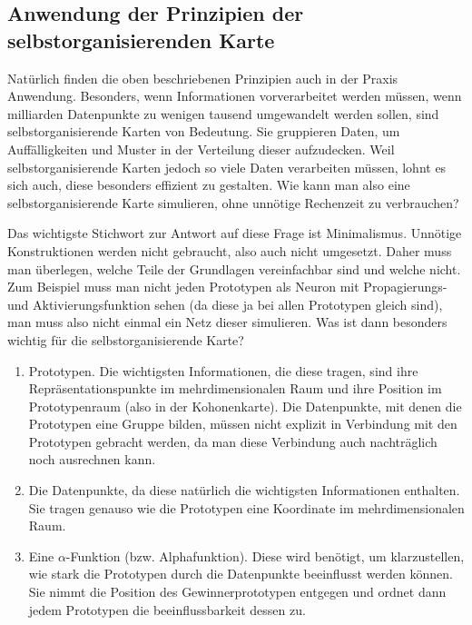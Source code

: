\documentclass[twoside,a4paper]{article}
\begin{document}
\subsection{Anwendung der Prinzipien der selbstorganisierenden Karte}

Natürlich finden die oben beschriebenen Prinzipien auch in der Praxis Anwendung. Besonders, wenn Informationen vorverarbeitet werden müssen, wenn milliarden Datenpunkte zu wenigen tausend umgewandelt werden sollen, sind selbstorganisierende Karten von Bedeutung. Sie gruppieren Daten, um Auffälligkeiten und Muster in der Verteilung dieser aufzudecken. Weil selbstorganisierende Karten jedoch so viele Daten verarbeiten müssen, lohnt es sich auch, diese besonders effizient zu gestalten. Wie kann man also eine selbstorganisierende Karte simulieren, ohne unnötige Rechenzeit zu verbrauchen?

Das wichtigste Stichwort zur Antwort auf diese Frage ist Minimalismus. Unnötige Konstruktionen werden nicht gebraucht, also auch nicht umgesetzt. Daher muss man überlegen, welche Teile der Grundlagen vereinfachbar sind und welche nicht. Zum Beispiel muss man nicht jeden Prototypen als Neuron mit Propagierungs- und Aktivierungsfunktion sehen (da diese ja bei allen Prototypen gleich sind), man muss also nicht einmal ein Netz dieser simulieren. Was ist dann besonders wichtig für die selbstorganisierende Karte?

\begin{enumerate}
\item Prototypen. Die wichtigsten Informationen, die diese tragen, sind ihre Repräsentationspunkte im mehrdimensionalen Raum und ihre Position im Prototypenraum (also in der Kohonenkarte). Die Datenpunkte, mit denen die Prototypen eine Gruppe bilden, müssen nicht explizit in Verbindung mit den Prototypen gebracht werden, da man diese Verbindung auch nachträglich noch ausrechnen kann.

\item Die Datenpunkte, da diese natürlich die wichtigsten Informationen enthalten. Sie tragen genauso wie die Prototypen eine Koordinate im mehrdimensionalen Raum.

\item Eine \(\alpha\)-Funktion (bzw. Alphafunktion). Diese wird benötigt, um klarzustellen, wie stark die Prototypen durch die Datenpunkte beeinflusst werden können. Sie nimmt die Position des Gewinnerprototypen entgegen und ordnet dann jedem Prototypen die beeinflussbarkeit dessen zu.
\end{enumerate}
\end{document}
